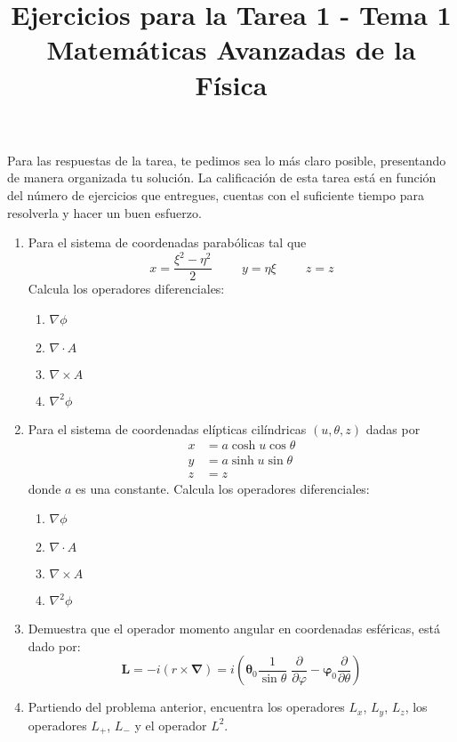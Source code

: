 \documentclass[12pt]{article}
\title{Ejercicios para la Tarea 1 - Tema 1 \\ \large{Matemáticas Avanzadas de la Física}}
\date{ }
\begin{document}
\vspace{-4cm}
\renewcommand\labelenumii{\theenumi.{\arabic{enumii}}}
\maketitle
\fontsize{14}{14}\selectfont
Para las respuestas de la tarea, te pedimos sea lo más claro posible, presentando de manera organizada tu solución. La calificación de esta tarea está en función del número de ejercicios que entregues, cuentas con el suficiente tiempo para resolverla y hacer un buen esfuerzo.
\begin{enumerate}
\item Para el sistema de coordenadas parabólicas tal que
\[ x = \dfrac{\xi^{2} - \eta^{2}}{2}  \hspace{1cm} y = \eta \xi \hspace{1cm} z = z\]
Calcula los operadores diferenciales:
\begin{enumerate}
\item $\nabla \phi$
\item $\nabla \cdot A$
\item $\nabla \times A$
\item $\nabla^{2} \phi$
\end{enumerate}
\item Para el sistema de coordenadas elípticas cilíndricas $(u, \theta, z)$ dadas por
\[ \begin{split}
x &= a \cosh u \cos \theta \\
y &= a \sinh u \sin \theta \\
z &= z
\end{split} \]
donde $a$ es una constante. Calcula los operadores diferenciales:
\begin{enumerate}
\item $\nabla \phi$
\item $\nabla \cdot A$
\item $\nabla \times A$
\item $\nabla^{2} \phi$
\end{enumerate}
\item Demuestra que el operador momento angular en coordenadas esféricas, está dado por:
\[ \mathbf{L} = - i (r \times \bm{\nabla}) = i \left( \bm{\theta}_{0} \dfrac{1}{\sin \theta} \; \dfrac{\partial}{\partial \varphi} - \bm{\varphi}_{0} \dfrac{\partial}{\partial \theta} \right)  \]
\item Partiendo del problema anterior, encuentra los operadores $L_{x}$, $L_{y}$, $L_{z}$, los operadores $L_{+}$, $L_{-}$ y el operador $L^{2}$.

\end{enumerate}
\end{document}
